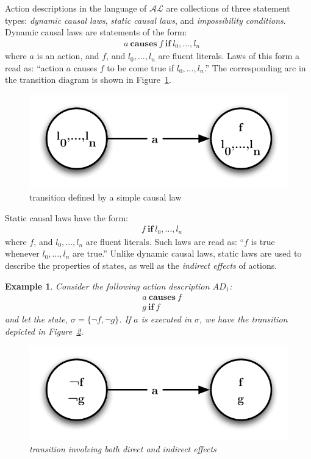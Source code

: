\documentclass{article}
\newtheorem{example}{Example}
\newcommand{\AL}{\ensuremath{\mathcal{AL}}}
\newcommand{\dynamiclaw}[2]{\ensuremath{#1 \: \mathbf{causes} \: #2}}
\newcommand{\dynamiclawp}[3]{\ensuremath{#1 \: \mathbf{causes} \: #2 \: \mathbf{if} \: #3}}
\newcommand{\staticlaw}[2]{\ensuremath{#1 \: \mathbf{if} \: #2}}
\begin{document}
Action descriptions in the language of $\AL$ are collections of three statement types: \emph{dynamic causal laws}, \emph{static causal laws}, and \emph{impossibility conditions}. Dynamic causal laws are statements of the form:
\begin{align*}
    &\dynamiclawp{a}{f}{l_{0},\ldots,l_{n}}
\end{align*}
where $a$ is an action, and $f$, and $l_{0},\ldots,l_{n}$ are fluent literals. Laws of this form a read as: ``action $a$ causes $f$ to be come true if $l_{0},\ldots,l_{n}$.'' The corresponding arc in the transition diagram is shown in Figure~\ref{fig-dcl}.
\begin{figure}[htb]
    \centering
    \includegraphics[scale=0.5]{dynamic-law}
    \caption{transition defined by a simple causal law}
    \label{fig-dcl}
\end{figure}

Static causal laws have the form:
\begin{align*}
    &\staticlaw{f}{l_{0},\ldots,l_{n}}
\end{align*}
where $f$, and $l_{0},\ldots,l_{n}$ are fluent literals. Such laws are read as: ``$f$ is true whenever $l_{0},\ldots,l_{n}$ are true.'' Unlike dynamic causal laws, static laws are used to describe the properties of states, as well as the \emph{indirect effects} of actions.
\begin{example}
{\rm
Consider the following action description $AD_{1}$:
\begin{align*}
    &\dynamiclaw{a}{f} \\
    &\staticlaw{g}{f}
\end{align*}
and let the state, $\sigma = \{\neg{f}, \neg{g}\}$. If $a$ is executed in $\sigma$, we have the transition depicted in Figure~\ref{fig-scl}.
\begin{figure}[htb]
    \centering
    \includegraphics[scale=0.5]{static-law}
    \caption{transition involving both direct and indirect effects}
    \label{fig-scl}
\end{figure}
}
\end{example}
\end{document}
